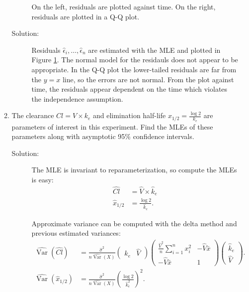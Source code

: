 \documentclass[letterpaper,11pt]{article}
\begin{document}
\begin{enumerate}
\begin{enumerate}
\begin{figure}
      \caption{On the left, residuals are plotted against time. On the right,
        residuals are plotted in a Q-Q plot.}
      \label{fig:p3_residuals}
    \end{figure}
    \begin{description}
    \item[Solution:] Residuals $\hat{\epsilon}_i,\ldots,\hat{\epsilon}_n$ are
      estimated with the MLE and plotted in Figure \ref{fig:p3_residuals}. The
      normal model for the residauls does not appear to be appropriate. In the
      Q-Q plot the lower-tailed residuals are far from the $y=x$ line, so the
      errors are not normal. From the plot against time, the residuals appear
      dependent on the time which violates the independence assumption.
    \end{description}
  \item The clearance $Cl = V \times k_e$ and elimination half-life
    $x_{1/2} = \frac{\log 2}{k_e}$ are parameters of interest in this experiment. Find
    the MLEs of these parameters along with asymptotic 95\% confidence intervals.
    \begin{description}
    \item[Solution:] The MLE is invariant to reparameterization, so compute the
      MLEs is easy:
      \begin{align}
        \hat{Cl}
        &= \hat{V} \times \hat{k}_e \nonumber\\
        \hat{x}_{1/2}
        &= \frac{\log 2}{\hat{k}_e}.
          \label{eqn:p3_mle_reparameterization}
      \end{align}

      Approximate variance can be computed with the delta method and previous
      estimated variances:
      \begin{align}
        \hat{\operatorname{Var}}\left(\hat{Cl}\right)
        &=\frac{\hat{\sigma}^2}{n\hat{\operatorname{Var}}\left(X\right)}
          \begin{pmatrix}
            \hat{k}_e & \hat{V}
          \end{pmatrix} \begin{pmatrix}
            \frac{\hat{V}^2}{n}\sum_{i=1}^nx_i^2 & -\hat{V}\bar{x} \\
            -\hat{V}\bar{x} & 1
          \end{pmatrix}
        \begin{pmatrix}
          \hat{k}_e \\ \hat{V}
        \end{pmatrix}.
        \nonumber\\
        \hat{\operatorname{Var}}\left(\hat{x}_{1/2}\right)
        &= \frac{\hat{\sigma}^2}{n\hat{\operatorname{Var}}\left(X\right)}
          \left(\frac{\log 2}{\hat{k}_e^2}\right)^2.
          \label{eqn:p3_variance_reparameterization}
      \end{align}      
    \end{description}
  \end{enumerate}
\end{enumerate}
\end{document}
